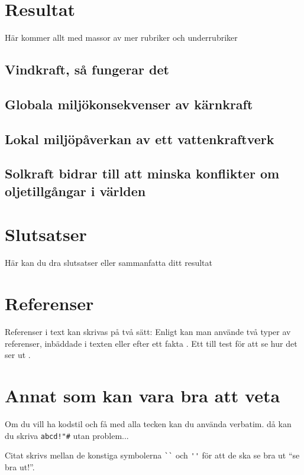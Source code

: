 \documentclass[11p]{article}
\begin{document}
    \section{Resultat}
    Här kommer allt med massor av mer rubriker och underrubriker
    \subsection{Vindkraft, så fungerar det}
    \subsection{Globala miljökonsekvenser av kärnkraft}
    \subsection{Lokal miljöpåverkan av ett vattenkraftverk}
    \subsection{Solkraft bidrar till att minska konflikter om oljetillgångar i världen}
    \subsection{}

    \section{Slutsatser}
    Här kan du dra slutsatser eller sammanfatta ditt resultat


    \section{Referenser}
    Referenser i text kan skrivas på två sätt: Enligt \textcite{Jens} kan man använde två typer av referenser, inbäddade i texten eller efter ett fakta \parencite{Fraenkel}. Ett till test för att se hur det ser ut \parencite[sid 55]{fermi}.

    \section{Annat som kan vara bra att veta}
    Om du vill ha kodstil och få med alla tecken kan du använda verbatim. då kan du skriva \verb|abcd!"#| utan problem...

    Citat skrivs mellan de konstiga symbolerna \verb|``| och \verb|''| för att de ska se bra ut ``se bra ut!''.
\end{document}

